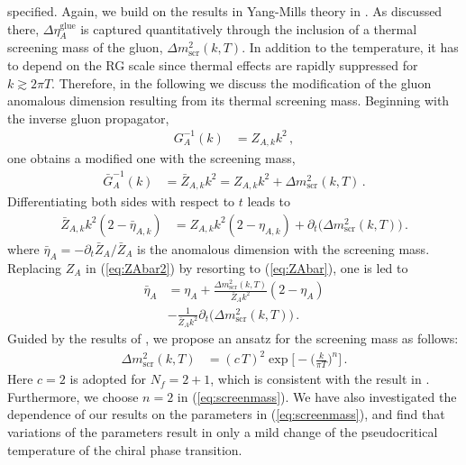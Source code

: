 \documentclass[%
reprint,
superscriptaddress,
showpacs,preprintnumbers,
 amsmath,amssymb,
 aps,
prd,
]{revtex4-1}
\def\eq#1{(\ref{#1})}
\begin{document}
specified. Again, we build on the results in Yang-Mills theory in
\cite{Cyrol:2017qkl}. As discussed there,
$\Delta\eta_{A}^{\text{glue}}$ is captured quantitatively through the
inclusion of a thermal screening mass of the gluon,
$\Delta m_\textrm{scr}^2(k,T)$. In addition to the temperature, it has
to depend on the RG scale since thermal effects are rapidly suppressed
for $k \gtrsim 2\pi T$. Therefore, in the following we discuss the
modification of the gluon anomalous dimension resulting from its
thermal screening mass. Beginning with the inverse gluon propagator,
%
\begin{align}
  G_A^{-1}(k)&=Z_{A,k}k^2\,,\label{}
\end{align}
%
one obtains a modified one with the screening mass,
%
\begin{align}
  \bar G_A^{-1}(k)
  &=\bar Z_{A,k}k^2=Z_{A,k}k^2+
    \Delta m_\textrm{scr}^2(k,T)\,.\label{eq:ZAbar}
\end{align}
%
Differentiating both sides with respect to $t$ leads to
%
\begin{align}
  \bar Z_{A,k}k^2(2-\bar \eta_{A,k})
  &=
    Z_{A,k}k^2(2-\eta_{A,k})+\partial_t
    \big(\Delta m_\textrm{scr}^2(k,T)\big)\,.
                                      \label{eq:ZAbar2}
\end{align}
%
where $\bar \eta_{A}=-\partial_t \bar Z_{A}/ \bar Z_{A}$ is the
anomalous dimension with the screening mass. Replacing $Z_{A}$ in
\eq{eq:ZAbar2} by resorting to \eq{eq:ZAbar}, one is led to
%
\begin{align}
  \bar \eta_{A}
  &=\eta_{A}+\frac{\Delta m_\textrm{scr}^2(k,T)}{\bar
    Z_{A}k^2}(2-\eta_{A})\nonumber\\[1ex]
  &-\frac{1}{\bar Z_{A}k^2}\partial_t
    \big(\Delta m_\textrm{scr}^2(k,T)\big)\,.\label{}
\end{align}
%
Guided by the results of \cite{Cyrol:2017qkl}, we propose an ansatz
for the screening mass as follows:
%
\begin{align}
  \Delta m_\textrm{scr}^2(k,T)
  &=(c\,T)^2 \exp\Big[-\Big(\frac{k}{\pi T}
    \Big)^n\Big]\,.\label{eq:screenmass}
\end{align}
%
Here $c=2$ is adopted for $N_f=2+1$, which is consistent with the
result in \cite{Cyrol:2017qkl}. Furthermore, we choose $n=2$ in
\eq{eq:screenmass}. We have also investigated the dependence of our
results on the parameters in \eq{eq:screenmass}, and find that
variations of the parameters result in only a mild change of the
pseudocritical temperature of the chiral phase transition.
\end{document}
